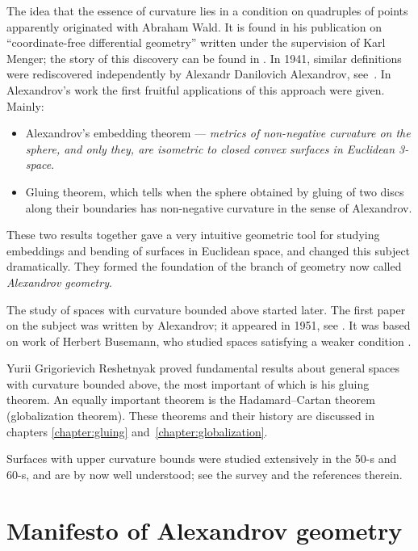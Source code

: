 The idea that the essence of curvature lies in a condition on quadruples of points apparently originated with Abraham Wald.
It is found in his publication on ``coordinate-free differential geometry'' \cite{wald} written under the supervision of Karl Menger;
the story of this discovery can be found in \cite{menger}.
In 1941, similar definitions were rediscovered independently by 
Alexandr Danilovich Alexandrov, %
see~\cite{alexandrov:def}.
In Alexandrov's work the first fruitful applications of this approach were given.
Mainly:
\begin{itemize}
\item Alexandrov's embedding theorem --- 
\textit{metrics of non-negative curvature on the sphere, and only they, are isometric to closed convex surfaces in Euclidean 3-space}. 
\item Gluing theorem, which tells  when the sphere obtained by gluing of two discs along their boundaries has non-negative curvature in the sense of Alexandrov.
\end{itemize}
These two results together gave  a very intuitive geometric tool for studying  embeddings and bending of surfaces in  Euclidean space, and changed this subject dramatically.
They formed the foundation of the branch of geometry now called \emph{Alexandrov geometry}.

The study of  spaces with curvature bounded above started later.
The first paper on the subject was written by Alexandrov; it appeared in 1951, see \cite{alexandrov:strong-angle}.
It was based on work of Herbert Busemann, who studied spaces satisfying a weaker condition \cite{busemann-CBA}.

Yurii Grigorievich Reshetnyak proved fundamental results about general spaces with curvature bounded above, the most important of which is his gluing theorem.
An equally important theorem is the Hadamard--Cartan theorem (globalization theorem).
These theorems and their history are discussed in chapters \ref{chapter:gluing} and~\ref{chapter:globalization}.

Surfaces with upper curvature bounds were studied extensively in the 50-s and 60-s, and are by now well understood; see the survey \cite{reshetnyak:survey} and the references therein.


\section*{Manifesto of Alexandrov geometry}

